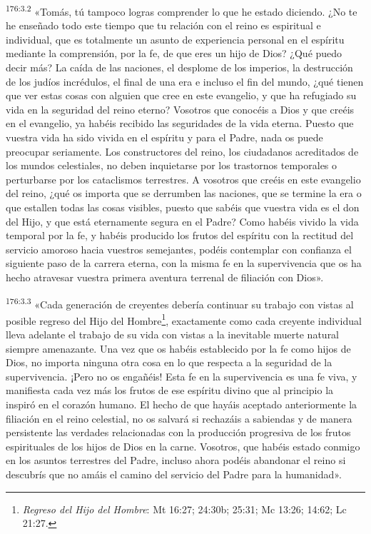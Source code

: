 \par 
\textsuperscript{176:3.2} «Tomás, tú tampoco logras comprender lo que he estado diciendo. ¿No te he enseñado todo este tiempo que tu relación con el reino es espiritual e individual, que es totalmente un asunto de experiencia personal en el espíritu mediante la comprensión, por la fe, de que eres un hijo de Dios? ¿Qué puedo decir más? La caída de las naciones, el desplome de los imperios, la destrucción de los judíos incrédulos, el final de una era e incluso el fin del mundo, ¿qué tienen que ver estas cosas con alguien que cree en este evangelio, y que ha refugiado su vida en la seguridad del reino eterno? Vosotros que conocéis a Dios y que creéis en el evangelio, ya habéis recibido las seguridades de la vida eterna. Puesto que vuestra vida ha sido vivida en el espíritu y para el Padre, nada os puede preocupar seriamente. Los constructores del reino, los ciudadanos acreditados de los mundos celestiales, no deben inquietarse por los trastornos temporales o perturbarse por los cataclismos terrestres. A vosotros que creéis en este evangelio del reino, ¿qué os importa que se derrumben las naciones, que se termine la era o que estallen todas las cosas visibles, puesto que sabéis que vuestra vida es el don del Hijo, y que está eternamente segura en el Padre? Como habéis vivido la vida temporal por la fe, y habéis producido los frutos del espíritu con la rectitud del servicio amoroso hacia vuestros semejantes, podéis contemplar con confianza el siguiente paso de la carrera eterna, con la misma fe en la supervivencia que os ha hecho atravesar vuestra primera aventura terrenal de filiación con Dios».

\par 
\textsuperscript{176:3.3} «Cada generación de creyentes debería continuar su trabajo con vistas al posible regreso del Hijo del Hombre\footnote{\textit{Regreso del Hijo del Hombre}: Mt 16:27; 24:30b; 25:31; Mc 13:26; 14:62; Lc 21:27.}, exactamente como cada creyente individual lleva adelante el trabajo de su vida con vistas a la inevitable muerte natural siempre amenazante. Una vez que os habéis establecido por la fe como hijos de Dios, no importa ninguna otra cosa en lo que respecta a la seguridad de la supervivencia. ¡Pero no os engañéis! Esta fe en la supervivencia es una fe viva, y manifiesta cada vez más los frutos de ese espíritu divino que al principio la inspiró en el corazón humano. El hecho de que hayáis aceptado anteriormente la filiación en el reino celestial, no os salvará si rechazáis a sabiendas y de manera persistente las verdades relacionadas con la producción progresiva de los frutos espirituales de los hijos de Dios en la carne. Vosotros, que habéis estado conmigo en los asuntos terrestres del Padre, incluso ahora podéis abandonar el reino si descubrís que no amáis el camino del servicio del Padre para la humanidad».


